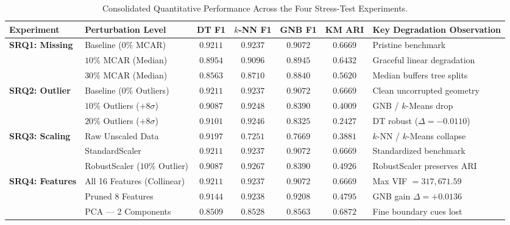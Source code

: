 \documentclass[11pt,a4paper]{article}
\begin{document}
\begin{table}[htbp]
    \centering
    \footnotesize
    \caption{Consolidated Quantitative Performance Across the Four Stress-Test Experiments.}
    \label{tab:stress_summary}
    \setlength{\tabcolsep}{3.5pt}
    \begin{tabularx}{\linewidth}{@{} l >{\raggedright\arraybackslash}p{3.4cm} cccc >{\raggedright\arraybackslash}X @{}}
        \toprule
        \textbf{Experiment} & \textbf{Perturbation Level} & \textbf{DT F1} & \textbf{$k$-NN F1} & \textbf{GNB F1} & \textbf{KM ARI} & \textbf{Key Degradation Observation} \\
        \midrule
        \multirow{3}{*}{\textbf{SRQ1: Missing}} & Baseline ($0\%$ MCAR) & $0.9211$ & $0.9237$ & $0.9072$ & $0.6669$ & Pristine benchmark \\
        & $10\%$ MCAR (Median) & $0.8954$ & $0.9096$ & $0.8945$ & $0.6432$ & Graceful linear degradation \\
        & $30\%$ MCAR (Median) & $0.8563$ & $0.8710$ & $0.8840$ & $0.5620$ & Median buffers tree splits \\
        \midrule
        \multirow{3}{*}{\textbf{SRQ2: Outlier}} & Baseline ($0\%$ Outliers) & $0.9211$ & $0.9237$ & $0.9072$ & $0.6669$ & Clean uncorrupted geometry \\
        & $10\%$ Outliers ($+8\sigma$) & $0.9087$ & $0.9248$ & $0.8390$ & $0.4009$ & GNB / $k$-Means drop \\
        & $20\%$ Outliers ($+8\sigma$) & $\mathbf{0.9101}$ & $\mathbf{0.9246}$ & $0.8325$ & $\mathbf{0.2427}$ & DT robust ($\Delta = -0.0110$) \\
        \midrule
        \multirow{3}{*}{\textbf{SRQ3: Scaling}} & Raw Unscaled Data & $\mathbf{0.9197}$ & $\mathbf{0.7251}$ & $0.7669$ & $0.3881$ & $k$-NN / $k$-Means collapse \\
        & StandardScaler & $0.9211$ & $0.9237$ & $0.9072$ & $0.6669$ & Standardized benchmark \\
        & RobustScaler ($10\%$ Outlier) & $0.9087$ & $0.9267$ & $0.8390$ & $\mathbf{0.4926}$ & RobustScaler preserves ARI \\
        \midrule
        \multirow{3}{*}{\textbf{SRQ4: Features}} & All 16 Features (Collinear) & $0.9211$ & $0.9237$ & $\mathbf{0.9072}$ & $0.6669$ & Max VIF $= 317{,}671.59$ \\
        & Pruned 8 Features & $0.9144$ & $0.9238$ & $\mathbf{0.9208}$ & $0.4795$ & GNB gain $\Delta = +0.0136$ \\
        & PCA --- 2 Components & $0.8509$ & $0.8528$ & $0.8563$ & $0.6872$ & Fine boundary cues lost \\
        \bottomrule
    \end{tabularx}
\end{table}
\end{document}
